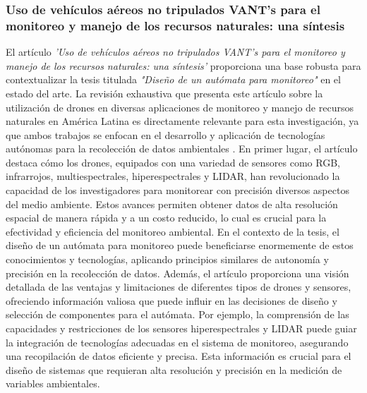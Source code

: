 \subsubsection{Uso de veh\'iculos a\'ereos  no tripulados VANT's para el monitoreo y manejo de los recursos naturales: una s\'intesis} %
\label{ssub:subsubsection name}
    El art\'iculo \textit{'Uso de veh\'iculos a\'ereos no tripulados VANT's para el monitoreo y manejo de los recursos naturales: una s\'intesis'} 
        proporciona una base robusta para contextualizar la tesis titulada \textit{"Dise\~no de un aut\'omata para monitoreo"} en 
        el estado del arte. La revisi\'on exhaustiva que presenta este art\'iculo sobre la utilizaci\'on de drones en diversas aplicaciones 
        de monitoreo y manejo de recursos naturales en Am\'erica Latina es directamente relevante para esta investigaci\'on, 
        ya que ambos trabajos se enfocan en el desarrollo y aplicaci\'on de tecnolog\'ias aut\'onomas para la recolecci\'on 
        de datos ambientales \cite{Guevara2020}.
    \vskip 0.5cm
    En primer lugar, el art\'iculo destaca c\'omo los drones, equipados con una variedad de sensores como RGB, infrarrojos, 
        multiespectrales, hiperespectrales y LIDAR, han revolucionado la capacidad de los investigadores para monitorear 
        con precisi\'on diversos aspectos del medio ambiente. Estos avances permiten obtener datos de alta resoluci\'on espacial 
        de manera r\'apida y a un costo reducido, lo cual es crucial para la efectividad y eficiencia del monitoreo ambiental. 
        En el contexto de la tesis, el dise\~no de un aut\'omata para monitoreo puede beneficiarse enormemente de estos conocimientos 
        y tecnolog\'ias, aplicando principios similares de autonom\'ia y precisi\'on en la recolecci\'on de datos.
    \vskip 0.5cm
    Adem\'as, el art\'iculo proporciona una visi\'on detallada de las ventajas y limitaciones de diferentes tipos de drones y sensores, 
        ofreciendo informaci\'on valiosa que puede influir en las decisiones de dise\~no y selecci\'on de componentes para el aut\'omata. 
        Por ejemplo, la comprensi\'on de las capacidades y restricciones de los sensores hiperespectrales y LIDAR puede guiar 
        la integraci\'on de tecnolog\'ias adecuadas en el sistema de monitoreo, asegurando una recopilaci\'on de datos eficiente y 
        precisa. Esta informaci\'on es crucial para el dise\~no de sistemas que requieran alta resoluci\'on y precisi\'on en la medici\'on 
        de variables ambientales.
